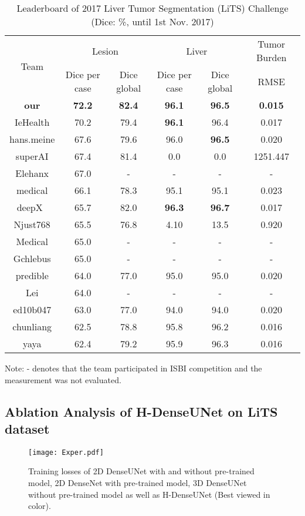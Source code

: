 \documentclass[journal]{IEEEtran}
\begin{document}
\begin{table*}[htpb]
	\centering \caption{Leaderboard of 2017 Liver Tumor Segmentation (LiTS) Challenge (Dice: \%, until 1st Nov. 2017)}
	\label{tab:result} {
		\centering
		\begin{tabular}{c|c|c|c|c|c}
			\hline
			\multirow{2}{*}{Team} & \multicolumn{2}{c|}{ Lesion } & \multicolumn{2}{|c}{ Liver }  & \multicolumn{1}{|c}{ Tumor Burden }\tabularnewline
			\cline{2-6}
			& Dice per case	& Dice global    & Dice per case & Dice global & RMSE \tabularnewline
			\hline
			\textbf{our} &  \textbf{72.2} & \textbf{82.4} & \textbf{96.1} & \textbf{96.5} &   \textbf{0.015}  \tabularnewline
			\hline
			IeHealth & 70.2 & 79.4  & \textbf{96.1} & 96.4   & 0.017 \tabularnewline
			\hline
			
			hans.meine & 67.6 & 79.6 & 96.0 & \textbf{96.5}  &  0.020 \tabularnewline
			\hline
			superAI & 67.4 & 81.4  & 0.0 & 0.0  & 1251.447 \tabularnewline
			\hline
			Elehanx \citep{han2017automatic}&  67.0 & -   & -  & - &  - \tabularnewline
			\hline
			medical & 66.1 & 78.3  & 95.1 & 95.1 &  0.023  \tabularnewline
			\hline
			deepX~\citep{yuan2017hierarchical} & 65.7 & 82.0 & \textbf{96.3} & \textbf{96.7}  & 0.017 \tabularnewline
			\hline
			Njust768 & 65.5  & 76.8  & 4.10 & 13.5   & 0.920 \tabularnewline
			\hline
			Medical \citep{vorontsov2017liver}&  65.0  & -  & -  & - & - \tabularnewline
			\hline
			Gchlebus \citep{chlebus2017neural} &  65.0 & -   & -  & -  & - \tabularnewline
			\hline
			predible & 64.0 & 77.0 & 95.0 &  95.0   & 0.020 \tabularnewline
			\hline	
			Lei \citep{bi2017automatic} &  64.0 &  - & -  & - & - \tabularnewline
			\hline
			ed10b047 & 63.0 & 77.0   & 94.0 & 94.0 &  0.020  \tabularnewline
			\hline	
			chunliang & 62.5 & 78.8 & 95.8 & 96.2  &   0.016 \tabularnewline
			\hline
			yaya  &  62.4 & 79.2  & 95.9 & 96.3  & 0.016 \tabularnewline
			\hline
\end{tabular}
		
		{	
			\begin{tablenotes}
				\centering
				\small
				\item Note: - denotes that the team participated in ISBI competition and the measurement was not evaluated.
			\end{tablenotes}
		}
	}
\end{table*}
\subsection{Ablation Analysis of H-DenseUNet on LiTS dataset}
\begin{figure}[!t]
	\centering
	\texttt{[image: Exper.pdf]}
	\caption{Training losses of 2D DenseUNet with and without pre-trained model, 2D DenseNet with pre-trained model, 3D DenseUNet without pre-trained model as well as H-DenseUNet (Best viewed in color).}
	\label{fig:loss}\centering
\end{figure}
\end{document}
